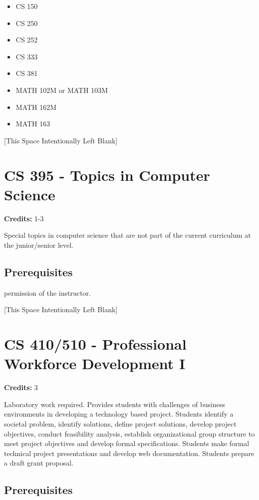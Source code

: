 \documentclass[]{article}
\providecommand{\tightlist}{%
  \setlength{\itemsep}{0pt}\setlength{\parskip}{0pt}}
\newcommand{\pagebreakhere}{
\vspace*{\fill}
\begin{center}
[This Space Intentionally Left Blank]
\end{center}
\vspace*{\fill}
\newpage
}
\begin{document}
\begin{itemize}
\tightlist
\item
  CS 150
\item
  CS 250
\item
  CS 252
\item
  CS 333
\item
  CS 381
\item
  MATH 102M or MATH 103M
\item
  MATH 162M
\item
  MATH 163
\end{itemize}

\pagebreakhere
\section{CS 395 - Topics in Computer
Science}\label{cs-395---topics-in-computer-science}

\textbf{Credits:} 1-3

Special topics in computer science that are not part of the current
curriculum at the junior/senior level.

\subsection{Prerequisites}\label{prerequisites-25}

permission of the instructor.

\pagebreakhere
\section{CS 410/510 - Professional Workforce Development
I}\label{cs-410510---professional-workforce-development-i}

\textbf{Credits:} 3

Laboratory work required. Provides students with challenges of business
environments in developing a technology based project. Students identify
a societal problem, identify solutions, define project solutions,
develop project objectives, conduct feasibility analysis, establish
organizational group structure to meet project objectives and develop
formal specifications. Students make formal technical project
presentations and develop web documentation. Students prepare a draft
grant proposal.

\subsection{Prerequisites}\label{prerequisites-26}
\end{document}
